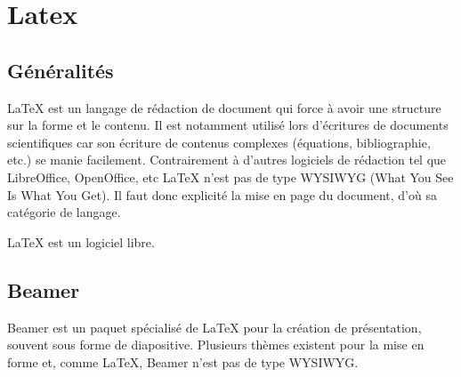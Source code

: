 \section{Latex}

\subsection{Généralités}
\LaTeX{} est un langage de rédaction de document qui force à avoir une structure sur la forme et le contenu. Il est notamment utilisé lors d'écritures de documents scientifiques car son écriture de contenus complexes (équations, bibliographie, etc.) se manie facilement.
Contrairement à d'autres logiciels de rédaction tel que LibreOffice, OpenOffice, etc \LaTeX{} n'est pas de type WYSIWYG (What You See Is What You Get). Il faut donc explicité la mise en page du document, d'où sa catégorie de langage.

\LaTeX{} est un logiciel libre.

\subsection{Beamer}
Beamer est un paquet spécialisé de LaTeX pour la création de présentation, souvent sous forme de diapositive. Plusieurs thèmes existent pour la mise en forme et, comme \LaTeX{}, Beamer n'est pas de type WYSIWYG.


